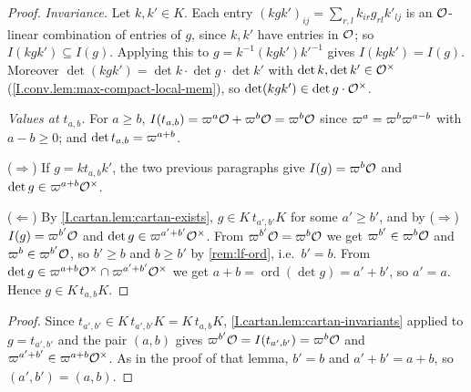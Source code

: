 \begin{lemma}
\end{lemma}
\begin{proof}
\emph{Invariance.} Let $k,k'\in K$. Each entry $(kgk')_{ij}=\sum_{r,l}k_{ir}g_{rl}k'_{lj}$ is an $\mathcal{O}$-linear
combination of entries of $g$, since $k,k'$ have entries in $\mathcal{O}$; so $I(kgk')\subseteq I(g)$. Applying this to
$g=k^{-1}(kgk')k'^{-1}$ gives $I(kgk')=I(g)$. Moreover $\det(kgk')=\det k\cdot\det g\cdot\det k'$ with
$\det k,\det k'\in\mathcal{O}^\times$ (\cref{I.conv.lem:max-compact-local-mem}), so $\det(kgk')\in\det g\cdot\mathcal{O}^\times$.

\emph{Values at $t_{a,b}$.} For $a\ge b$, $I(t_{a,b})=\varpi^a\mathcal{O}+\varpi^b\mathcal{O}=\varpi^b\mathcal{O}$ since
$\varpi^a=\varpi^b\varpi^{a-b}$ with $a-b\ge0$; and $\det t_{a,b}=\varpi^{a+b}$.

($\Rightarrow$) If $g=kt_{a,b}k'$, the two previous paragraphs give $I(g)=\varpi^b\mathcal{O}$ and
$\det g\in\varpi^{a+b}\mathcal{O}^\times$.

($\Leftarrow$) By \cref{I.cartan.lem:cartan-exists}, $g\in K\,t_{a',b'}K$ for some $a'\ge b'$, and by ($\Rightarrow$)
$I(g)=\varpi^{b'}\mathcal{O}$ and $\det g\in\varpi^{a'+b'}\mathcal{O}^\times$. From $\varpi^{b'}\mathcal{O}=\varpi^b\mathcal{O}$ we get
$\varpi^{b'}\in\varpi^b\mathcal{O}$ and $\varpi^b\in\varpi^{b'}\mathcal{O}$, so $b'\ge b$ and $b\ge b'$ by \cref{rem:lf-ord}, i.e.\
$b'=b$. From $\det g\in\varpi^{a+b}\mathcal{O}^\times\cap\varpi^{a'+b'}\mathcal{O}^\times$ we get
$a+b=\operatorname{ord}(\det g)=a'+b'$, so $a'=a$. Hence $g\in K\,t_{a,b}K$.
\end{proof}

\begin{lemma}
\end{lemma}
\begin{proof}
Since $t_{a',b'}\in K\,t_{a',b'}K=K\,t_{a,b}K$, \cref{I.cartan.lem:cartan-invariants} applied to $g=t_{a',b'}$ and
the pair $(a,b)$ gives $\varpi^{b'}\mathcal{O}=I(t_{a',b'})=\varpi^b\mathcal{O}$ and $\varpi^{a'+b'}\in\varpi^{a+b}\mathcal{O}^\times$. As in
the proof of that lemma, $b'=b$ and $a'+b'=a+b$, so $(a',b')=(a,b)$.
\end{proof}

